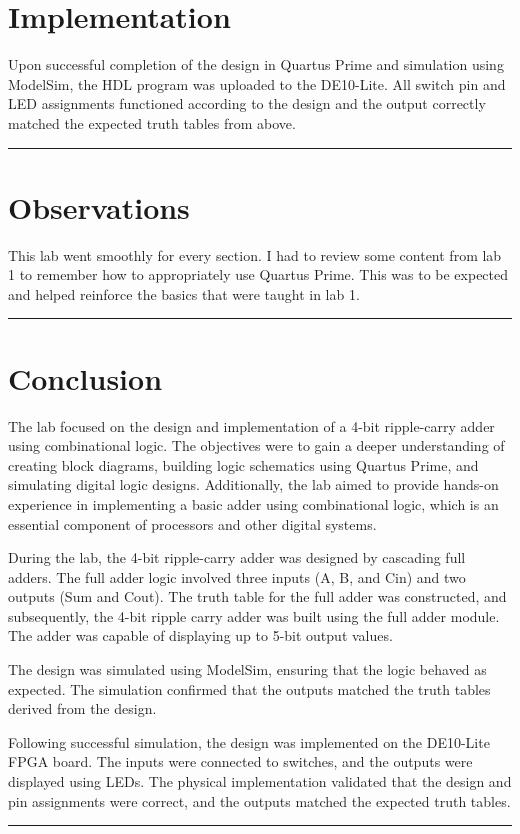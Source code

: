 \documentclass[11pt]{article}
\begin{document}
\section*{\textcolor{mycolor}{Implementation}}
Upon successful completion of the design in Quartus Prime and simulation using ModelSim, the HDL program was uploaded to the DE10-Lite. All switch pin and LED assignments functioned according to the design and the output correctly matched the expected truth tables from above.
\vspace{5mm}
\hrule

\section*{\textcolor{mycolor}{Observations}}
This lab went smoothly for every section. I had to review some content from lab 1 to remember how to appropriately use Quartus Prime. This was to be expected and helped reinforce the basics that were taught in lab 1.
\vspace{5mm}
\hrule

\section*{\textcolor{mycolor}{Conclusion}}
The lab focused on the design and implementation of a 4-bit ripple-carry adder using combinational logic. The objectives were to gain a deeper understanding of creating block diagrams, building logic schematics using Quartus Prime, and simulating digital logic designs. Additionally, the lab aimed to provide hands-on experience in implementing a basic adder using combinational logic, which is an essential component of processors and other digital systems.

During the lab, the 4-bit ripple-carry adder was designed by cascading full adders. The full adder logic involved three inputs (A, B, and Cin) and two outputs (Sum and Cout). The truth table for the full adder was constructed, and subsequently, the 4-bit ripple carry adder was built using the full adder module. The adder was capable of displaying up to 5-bit output values.

The design was simulated using ModelSim, ensuring that the logic behaved as expected. The simulation confirmed that the outputs matched the truth tables derived from the design.

Following successful simulation, the design was implemented on the DE10-Lite FPGA board. The inputs were connected to switches, and the outputs were displayed using LEDs. The physical implementation validated that the design and pin assignments were correct, and the outputs matched the expected truth tables.
\vspace{5mm}
\hrule
\end{document}
